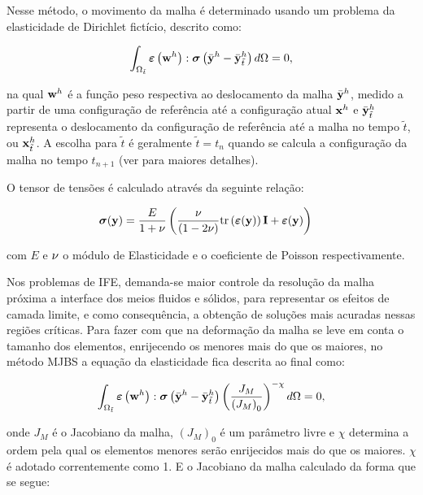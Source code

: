 \documentclass[tese_patricia]{subfiles}
\begin{document}
Nesse método, o movimento da malha é determinado usando um problema da elasticidade de Dirichlet fictício, descrito como:

\begin{align}
	\int_{\Omega_{\tilde{t}}} \bm{\varepsilon} \left(\mathbf{w}^h\right) : \boldsymbol{\sigma} \left(\bar{\mathbf{y}}^h - \bar{\mathbf{y}}^h_{\tilde{t}}\right) d\Omega = 0,
	\label{eq:elasticityequation}
\end{align}


\noindent na qual $\mathbf{w}^h$ é a função peso respectiva ao deslocamento da malha  $\bar{\mathbf{y}}^h$, medido a partir de uma configuração de referência até a configuração atual $\mathbf{x}^h$ e 
$\bar{\mathbf{y}}^h_{\tilde{t}}$ representa o deslocamento da configuração de referência até a malha no tempo ${\tilde{t}}$, ou $\mathbf{x}^h_{\tilde{t}}$. 
A escolha para ${\tilde{t}}$ é geralmente ${\tilde{t}} = {t_{n}}$ quando se calcula a configuração da malha no tempo ${t_{n+1}}$ (ver  para maiores detalhes). 

O tensor de tensões é calculado através da seguinte relação:

\begin{align}
	\boldsymbol{\sigma}(\mathbf{y})
	&=
	\frac{E}{1+\nu}
	\left(
	\frac{\nu}{(1 - 2 \nu)}
	\mathrm{tr}\left(\bm{\varepsilon}(\mathbf{y})\right)\mathbf{I}
	+
	\bm{\varepsilon}(\mathbf{y})
	\right)
\end{align}

\noindent com $E$ e $\nu$ o módulo de Elasticidade e o coeficiente de Poisson respectivamente.

Nos problemas de IFE, demanda-se maior controle da resolução da malha próxima a interface dos meios fluidos e sólidos, para representar os efeitos de camada limite, e como consequência, a obtenção de soluções mais acuradas nessas regiões críticas. Para fazer com que na deformação da malha se leve em conta o tamanho dos elementos, enrijecendo os menores mais do que os maiores, no método MJBS a equação da elasticidade fica descrita ao final como:

\begin{align}
	\int_{\Omega_{\tilde{t}}} \bm{\varepsilon} \left(\mathbf{w}^h\right) : \boldsymbol{\sigma} \left(\bar{\mathbf{y}}^h- \bar{\mathbf{y}}^h_{\tilde{t}}\right) \left(\frac{J_M}{\left({J_M}\right)_0}\right)^{-\chi} d\Omega = 0, 
	\label{eq:MJBS}
\end{align}

\noindent onde $J_M$ é o Jacobiano da malha, $(J_M)_0$ é um parâmetro livre e $\chi$ determina a ordem pela qual os elementos menores serão enrijecidos mais do que os maiores.  $\chi$ é adotado correntemente como 1. E o Jacobiano da malha calculado da forma que se segue:
\end{document}
